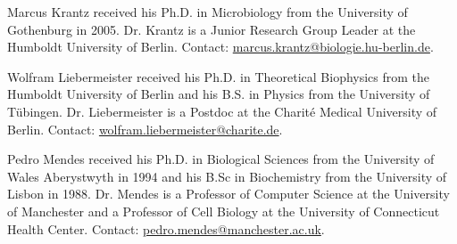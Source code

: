 \documentclass[journal,transmag]{IEEEtran}
\begin{document}
\begin{IEEEbiography}{Marcus Krantz}
received his Ph.D. in Microbiology from the University of Gothenburg in 2005.
Dr. Krantz is a Junior Research Group Leader at the Humboldt University of Berlin.
Contact: \href{mailto:marcus.krantz@biologie.hu-berlin.de}{marcus.krantz@biologie.hu-berlin.de}.
\end{IEEEbiography}

\begin{IEEEbiography}{Wolfram Liebermeister}
received his Ph.D. in Theoretical Biophysics from the Humboldt University of Berlin and his B.S. in Physics from the University of T\"ubingen.
Dr. Liebermeister is a Postdoc at the Charit\'e Medical University of Berlin.
Contact: \href{mailto:wolfram.liebermeister@charite.de}{wolfram.liebermeister@charite.de}.
\end{IEEEbiography}

\begin{IEEEbiography}{Pedro Mendes}
received his Ph.D. in Biological Sciences from the University of Wales Aberystwyth in 1994 and his B.Sc in Biochemistry from the University of Lisbon in 1988.
Dr. Mendes is a Professor of Computer Science at the University of Manchester and a Professor of Cell Biology at the University of Connecticut Health Center.
Contact: \href{mailto:pedro.mendes@manchester.ac.uk}{pedro.mendes@manchester.ac.uk}.
\end{IEEEbiography}
\end{document}
